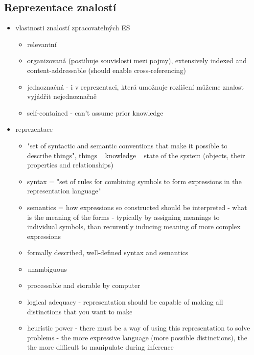 \subsection{Reprezentace znalostí}

\begin{framed}
  \begin{itemize}
    \item vlastnosti znalostí zpracovatelných ES
      \begin{itemize}
        \item relevantní
        \item organizovaná (postihuje souvislosti mezi pojmy), extensively
          indexed and content-addressable (should enable cross-referencing)
        \item jednoznačná - i v reprezentaci, která umožnuje rozlišení můžeme
          znalost vyjádřit nejednoznačně
        \item self-contained - can't assume prior knowledge
      \end{itemize}
    \item reprezentace
      \begin{itemize}
        \item "set of syntactic and semantic conventions that make it possible
          to describe things", things ~ knowledge ~ state of the system
          (objects, their properties and relationships)
        \item syntax = "set of rules for combining symbols to form expressions
          in the representation language"
        \item semantics = how expressions so constructed should be interpreted
          - what is the meaning of the forms - typically by assigning meanings
          to individual symbols, than recurently inducing meaning of more
          complex expressions
        \item formally described, well-defined syntax and semantics
        \item unambiguous
        \item processable and storable by computer
        \item logical adequacy - representation should be capable of making all
          distinctions that you want to make
        \item heuristic power - there must be a way of using this representation
          to solve problems - the more expressive language (more possible
          distinctions), the the more difficult to manipulate during inference

\end{itemize}
\end{itemize}
\end{framed}
